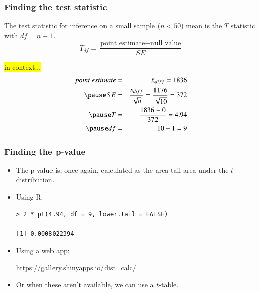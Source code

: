 \begin{frame}
\frametitle{Finding the test statistic}

{The test statistic for inference on a small sample ($n < 50$) mean is the $T$ statistic with $df = n - 1$.
\[ T_{df} = \frac{\text{point estimate} - \text{null value}}{SE} \]}

\pause

\vspace{-0.5cm}

\hl{in context...}
\begin{eqnarray*}
point~estimate &=& \bar{x}_{diff} = 1836 \\
\pause
SE &=& \frac{s_{diff}}{\sqrt{n}} = \frac{1176}{\sqrt{10}} = 372 \\
\pause
T &=& \frac{1836 - 0}{372} = 4.94 \\
\pause
df &=& 10 - 1 = 9
\end{eqnarray*}

\vspace{-0.25cm}


\end{frame}


\begin{frame}[fragile]
\frametitle{Finding the p-value}

\begin{itemize}

\item The p-value is, once again, calculated as the area tail area under the $t$ distribution.

\pause

\item Using R:
\begin{verbatim}
> 2 * pt(4.94, df = 9, lower.tail = FALSE)

[1] 0.0008022394
\end{verbatim}

\pause

\item Using a web app:

\href{https://gallery.shinyapps.io/dist_calc/}{\textcolor{oiB}{https://gallery.shinyapps.io/dist\_calc/}}

\pause

\item Or when these aren't available, we can use a $t$-table.

\end{itemize}

\end{frame}

